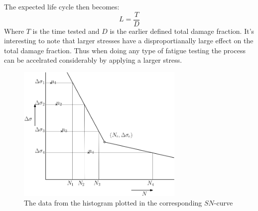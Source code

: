 \documentclass[11pt, a4paper]{article}
\begin{document}
The expected life cycle then becomes:
\begin{equation}
  L = \frac{T}{D}
\end{equation}
Where $T$ is the time tested and $D$ is the earlier defined total damage fraction. It's interesting to note that larger stresses have a disproportianally large effect on the total damage fraction. Thus when doing any type of fatigue testing the process can be accelrated considerably by applying a larger stress.
\begin{figure}[H]
  \centerline{\includegraphics[width=80mm]{images/SN_curve.png}}
  \caption{The data from the histogram plotted in the corresponding $SN$-curve}
  \label{fig:SN2}
\end{figure}
\end{document}
